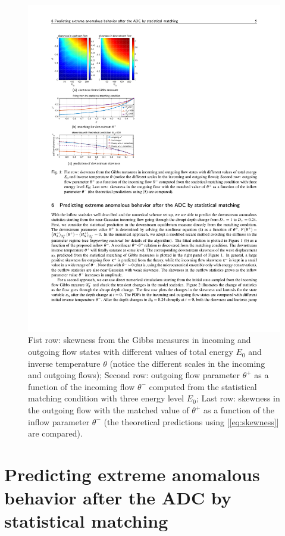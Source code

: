 \documentclass[9pt,twocolumn,twoside,lineno]{pnas-new}
\begin{document}
\begin{figure}[h]
\centering
\includegraphics[scale=1.]{./fig1}

\caption{Fist row: skewness from the Gibbs measures in incoming and outgoing
flow states with different values of total energy $E_{0}$ and inverse
temperature $\theta$ (notice the different scales in the incoming
and outgoing flows); Second row: outgoing flow parameter $\theta^{+}$
as a function of the incoming flow $\theta^{-}$ computed from the
statistical matching condition with three energy level $E_{0}$; Last
row: skewness in the outgoing flow with the matched value of $\theta^{+}$
as a function of the inflow parameter $\theta^{-}$ (the theoretical
predictions using [\ref{eq:skewness}] are compared).\label{fig:matching}}
\end{figure}

\section{Predicting extreme anomalous behavior after the ADC by statistical matching}
\end{document}
